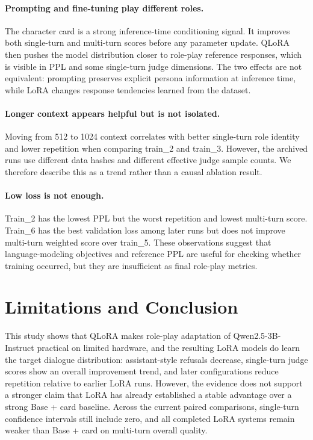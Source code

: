 \documentclass{article}
\newcommand{\card}{Base + card\xspace}
\begin{document}
\paragraph{Prompting and fine-tuning play different roles.}
The character card is a strong inference-time conditioning signal. It improves
both single-turn and multi-turn scores before any parameter update. QLoRA then
pushes the model distribution closer to role-play reference responses, which is
visible in PPL and some single-turn judge dimensions. The two effects are not
equivalent: prompting preserves explicit persona information at inference time,
while LoRA changes response tendencies learned from the dataset.

\paragraph{Longer context appears helpful but is not isolated.}
Moving from 512 to 1024 context correlates with better single-turn role
identity and lower repetition when comparing train\_2 and train\_3. However,
the archived runs use different data hashes and different effective judge
sample counts. We therefore describe this as a trend rather than a causal
ablation result.

\paragraph{Low loss is not enough.}
Train\_2 has the lowest PPL but the worst repetition and lowest multi-turn
score. Train\_6 has the best validation loss among later runs but does not
improve multi-turn weighted score over train\_5. These observations suggest
that language-modeling objectives and reference PPL are useful for checking
whether training occurred, but they are insufficient as final role-play
metrics.

\section{Limitations and Conclusion}

This study shows that QLoRA makes role-play adaptation of
Qwen2.5-3B-Instruct practical on limited hardware, and the resulting LoRA
models do learn the target dialogue distribution: assistant-style refusals
decrease, single-turn judge scores show an overall improvement trend, and later
configurations reduce repetition relative to earlier LoRA runs. However, the
evidence does not support a stronger claim that LoRA has already established a
stable advantage over a strong \card baseline. Across the current paired
comparisons, single-turn confidence intervals still include zero, and all
completed LoRA systems remain weaker than \card on multi-turn overall quality.
\end{document}

